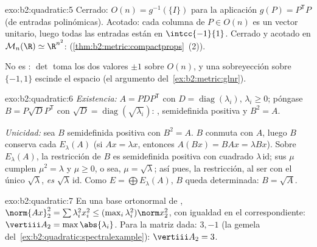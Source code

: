 \begin{solution}{exo:b2:quadratic:5}
Cerrado: $O(n) = g^{-1}(\{I\})$ para la aplicación  $g(P) =
P^{\mathsf T}P$ (de entradas polinómicas). Acotado: cada columna de $P
\in O(n)$ es un vector unitario, luego todas las entradas están en
$\intcc{-1}{1}$. Cerrado y acotado en $\mathcal{M}_n(\R) \simeq
\R^{n^2}$:  (\cref{thm:b2:metric:compactprops}~(2)).

No es : $\det$ toma los dos valores $\pm1$ sobre $O(n)$, y una
sobreyección  sobre $\{-1, 1\}$ escinde el espacio (el argumento
del~\cref{ex:b2:metric:glnr}).
\end{solution}

\begin{solution}{exo:b2:quadratic:6}
\emph{Existencia:} $A = PDP^{\mathsf T}$ con $D =
\operatorname{diag}(\lambda_i)$, $\lambda_i \geq 0$; póngase $B =
P\sqrt D P^{\mathsf T}$ con $\sqrt D =
\operatorname{diag}(\sqrt{\lambda_i})$: , semidefinida
positiva y $B^2 = A$.

\emph{Unicidad:} sea $B$  semidefinida positiva con $B^2 = A$.
$B$ conmuta con $A$, luego $B$ conserva cada 
$E_\lambda(A)$ (si $Ax = \lambda x$, entonces $A(Bx) = BAx = \lambda
Bx$). Sobre $E_\lambda(A)$, la restricción de $B$ es 
semidefinida positiva con cuadrado $\lambda\,\mathrm{id}$; sus
 $\mu$ cumplen $\mu^2 = \lambda$ y $\mu \geq 0$, o sea,
$\mu = \sqrt\lambda$; así pues, la restricción, al ser
 con el único  $\sqrt\lambda$, \emph{es}
$\sqrt\lambda\,\mathrm{id}$. Como $E = \bigoplus E_\lambda(A)$, $B$
queda determinada: $B = \sqrt A$.
\end{solution}

\begin{solution}{exo:b2:quadratic:7}
En una base ortonormal de , $\norm{Ax}_2^2 = \sum
\lambda_i^2 x_i^2 \leq (\max_i \lambda_i^2)\norm x_2^2$, con igualdad
en el  correspondiente: $\vertiii A_2 =
\max\abs{\lambda_i}$. Para la matriz dada:  $3, -1$ (la
gemela del~\cref{ex:b2:quadratic:spectralexample}): $\vertiii A_2 = 3$.
\end{solution}

